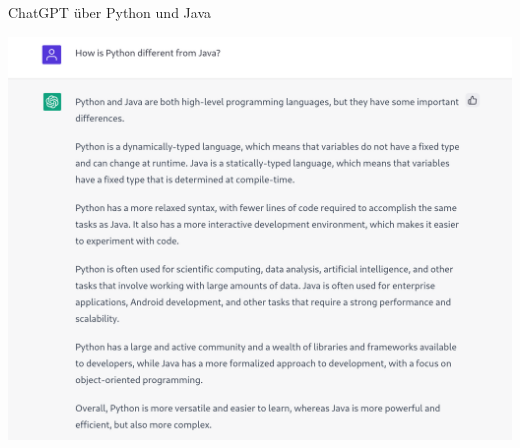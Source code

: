 \begin{frame}{ChatGPT über Python und Java}
    \begin{center}
        \includegraphics[width=.85\textwidth]{img/chatgpt-python-java}
    \end{center}
\end{frame}

